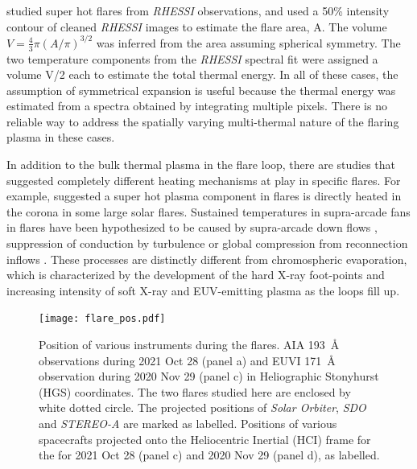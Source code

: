 \cite{caspi10} studied super hot flares from {\it RHESSI} observations, and used a 50\% intensity contour of cleaned {\it RHESSI} images to estimate the flare area, A. The volume $V=\frac{4}{3}\pi (A/\pi)^{3/2}$ was inferred from the area assuming spherical symmetry.  The two temperature components from the {\it RHESSI} spectral fit were assigned a volume V/2 each to estimate the total thermal energy. In all of these cases, the assumption of symmetrical expansion is useful because the thermal energy was estimated from a spectra obtained by integrating multiple pixels. There is no reliable way to address the spatially varying multi-thermal nature of the flaring plasma in these cases. 

In addition to the bulk thermal plasma in the flare loop, there are studies that suggested completely different heating mechanisms at play in specific flares. For example, \citet{longcope11} suggested a super hot plasma component in flares is directly heated in the corona in some large solar flares. Sustained temperatures in supra-arcade fans in flares have been hypothesized to be caused by supra-arcade down flows \citep[e.g.][]{reeves17}, suppression of conduction by turbulence \citep[e.g.][]{xie23} or global compression from reconnection inflows \citep[e.g.][]{reeves19}. These processes are distinctly different from chromospheric evaporation, which is characterized by the development of the hard X-ray foot-points and increasing intensity of soft X-ray and EUV-emitting plasma as the loops fill up.

\begin{figure}[ht!]
    \centering
    \texttt{[image: flare\_pos.pdf]}
    \caption[Position of various instruments during the flares.]{Position of various instruments during the flares. AIA 193~{\AA} observations during 2021 Oct 28 (panel a) and EUVI 171~{\AA} observation during 2020 Nov 29 (panel c) in Heliographic Stonyhurst (HGS) coordinates. The two flares studied here are enclosed by white dotted circle. The projected positions of {\it Solar Orbiter}, {\it SDO} and {\it STEREO-A} are marked as labelled. Positions of various spacecrafts projected onto the Heliocentric Inertial (HCI) frame for the for 2021 Oct 28 (panel c) and 2020 Nov 29 (panel d), as labelled.}
    \label{fig:sc_pos}
\end{figure}

